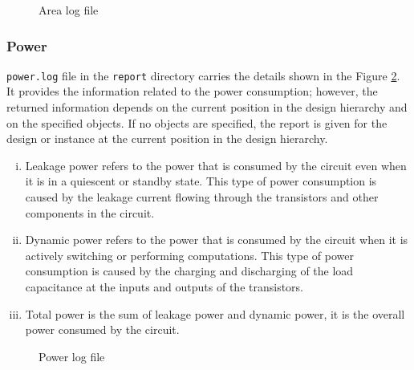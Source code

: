 \documentclass[a4paper,11pt]{article}%
\begin{document}
\begin{figure}[h]
	\centering
	\caption{Area log file}
	\label{fig:area_log}
\end{figure}


\subsubsection{Power}
{\tt power.log} file in the {\tt report} directory carries the details shown in the Figure \ref{fig:power_log}. It provides the information related to the power consumption; however, the returned information depends on the current position in the design hierarchy and on the specified objects. If no objects are specified, the report is given for the design or instance at the current position in the design hierarchy\cite{genus_command_ref_2019}.

\begin{enumerate}[i.] %
	\item Leakage power refers to the power that is consumed by the circuit even when it is in a quiescent or standby state. This type of power consumption is caused by the leakage current flowing through the transistors and other components in the circuit.
	
	\item Dynamic power refers to the power that is consumed by the circuit when it is actively switching or performing computations. This type of power consumption is caused by the charging and discharging of the load capacitance at the inputs and outputs of the transistors.
	
	\item Total power is the sum of leakage power and dynamic power, it is the overall power consumed by the circuit.
\end{enumerate}


\begin{figure}[h]
	\centering
	\caption{Power log file}
	\label{fig:power_log}
\end{figure}
\end{document}
